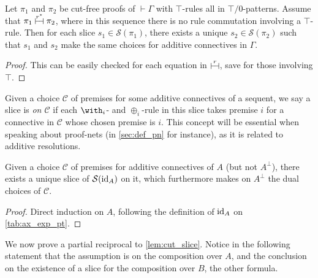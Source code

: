 \documentclass{lmcs}
\newcommand*{\orth}{^\perp} %
\renewcommand*{\fCenter}{\vdash} %
\newcommand*{\Slices}{\mathcal{S}}
\newcommand{\vdashv}{\mathrel{\lower .22ex \hbox{$\vdash\!\dashv$}}}
\DeclareRobustCommand{\astsymbol}[1]{\mathrel{\ooalign{{$\vdashv$}\crcr{$\stackrel{#1}{\hphantom{\vdashv}\vphantom{\to}}$}}}}
\newcommand{\eqcone}{\astsymbol{r}} %
\newcommand{\eqc}{\astsymbol{r^\ast}} %
\newcommand*{\id}[1]{\ensuremath{\textnormal{id}_{#1}}}
\begin{document}
\begin{lem}
\label{lem:com_slice}
Let $\pi_1$ and $\pi_2$ be cut-free proofs of $\fCenter\Gamma$ with $\top$-rules all in $\top/0$-patterns.
Assume that $\pi_1\eqc\pi_2$, where in this sequence there is no rule commutation involving a $\top$-rule.
Then for each slice $s_1\in\Slices(\pi_1)$, there exists a unique $s_2\in\Slices(\pi_2)$ such that $s_1$ and $s_2$ make the same choices for additive connectives in $\Gamma$.
\end{lem}
\begin{proof}
This can be easily checked for each equation in $\eqcone$, save for those involving $\top$.
\end{proof}

Given a choice $\mathcal{C}$ of premises for some additive connectives of a sequent, we say a slice is \emph{on $\mathcal{C}$} if each $\with_i$- and $\oplus_i$-rule in this slice takes premise $i$ for a connective in $\mathcal{C}$ whose chosen premise is $i$.
This concept will be essential when speaking about proof-nets (in \autoref{sec:def_pn} for instance), as it is related to additive resolutions.

\begin{lem}
\label{lem:id_slice}
Given a choice $\mathcal{C}$ of premises for additive connectives of $A$ (but not $A\orth$), there exists a unique slice of $\Slices(\id{A})$ on it, which furthermore makes on $A\orth$ the dual choices of $\mathcal{C}$.
\end{lem}
\begin{proof}
Direct induction on $A$, following the definition of $\id{A}$ on \autoref{tab:ax_exp_pt}.
\end{proof}

We now prove a partial reciprocal to \autoref{lem:cut_slice}.
Notice in the following statement that the assumption is on the composition over $A$, and the conclusion on the existence of a slice for the composition over $B$, the other formula.
\end{document}
